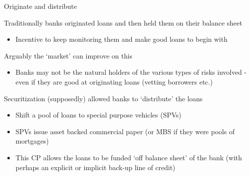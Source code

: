 \begin{frame}{Originate and distribute}

Traditionally banks originated loans and then held them on their balance sheet
\begin{itemize}
\item	Incentive to keep monitoring them and make good loans to begin with
\end{itemize}
\vspace{2mm}
Arguably the `market' can improve on this
\begin{itemize}
\item	Banks may not be the natural holders of the various types of risks involved - even if they are good at originating loans (vetting borrowers etc.)
\end{itemize}
\vspace{2mm}
Securitization (supposedly) allowed banks to `distribute' the loans
	\begin{itemize}
	\item	Shift a pool of loans to special purpose vehicles (SPVs)
	\item 	SPVs issue asset backed commercial paper (or MBS if they were pools of mortgages)
	\item	This CP allows the loans to be funded `off balance sheet' of the bank (with perhaps an explicit or implicit back-up line of credit)
	\end{itemize}

\end{frame}



